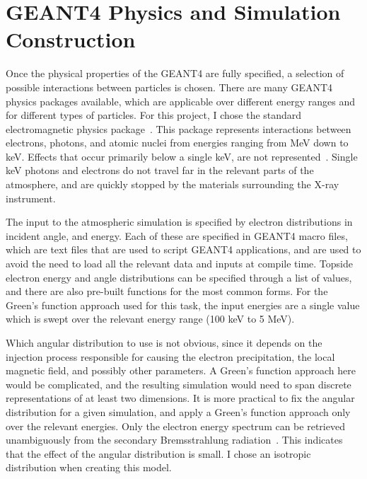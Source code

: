 \section{GEANT4 Physics and Simulation Construction}

Once the physical properties of the GEANT4 are fully specified, a selection of possible interactions between particles is chosen. There are many GEANT4 physics packages available, which are applicable over different energy ranges and for different types of particles. For this project, I chose the standard electromagnetic physics package~\citep{Burkhardt2004}. This package represents interactions between electrons, photons, and atomic nuclei from energies ranging from MeV down to keV. Effects that occur primarily below a single keV, are not represented~\citep{Guatelli2004}. Single keV photons and electrons do not travel far in the relevant parts of the atmosphere, and are quickly stopped by the materials surrounding the X-ray instrument. 

The input to the atmospheric simulation is specified by electron distributions in incident angle, and energy. Each of these are specified in GEANT4 macro files, which are text files that are used to script GEANT4 applications, and are used to avoid the need to load all the relevant data and inputs at compile time. Topside electron energy and angle distributions can be specified through a list of values, and there are also pre-built functions for the most common forms. For the Green's function approach used for this task, the input energies are a single value which is swept over the relevant energy range (100 keV to 5 MeV). 

Which angular distribution to use is not obvious, since it depends on the injection process responsible for causing the electron precipitation, the local magnetic field, and possibly other parameters. A Green's function approach here would be complicated, and the resulting simulation would need to span discrete representations of at least two dimensions. It is more practical to fix the angular distribution for a given simulation, and apply a Green's function approach only over the relevant energies. Only the electron energy spectrum can be retrieved unambiguously from the secondary Bremsstrahlung radiation~\citep{Brown2006}. This indicates that the effect of the angular distribution is small. I chose an isotropic distribution when creating this model.

